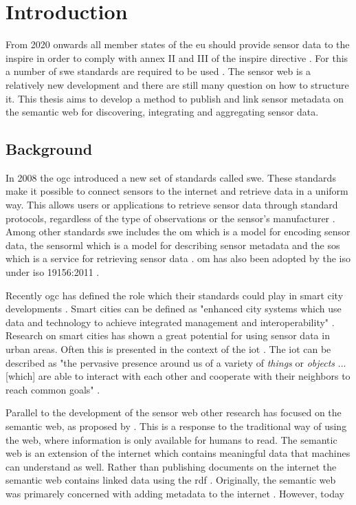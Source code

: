 
\chapter{Introduction}
\label{chap:introduction}

From 2020 onwards all member states of the \ac{eu} should provide sensor data to the \ac{inspire} in order to comply with annex II and III of the \ac{inspire} directive \citep{SDI:INSPIRE5}. For this a number of \ac{swe} standards are required to be used \citep{SDI:INSPIRE2}. The sensor web is a relatively new development and there are still many question on how to structure it. This thesis aims to develop a method to publish and link sensor metadata on the semantic web for discovering, integrating and aggregating sensor data.

\section{Background}
In 2008 the \ac{ogc} introduced a new set of standards called \ac{swe}. These standards make it possible to connect sensors to the internet and retrieve data in a uniform way. This allows users or applications to retrieve sensor data through standard protocols, regardless of the type of observations or the sensor's manufacturer \citep{SW:Botts}. Among other standards \ac{swe} includes the \ac{om} which is a model for encoding sensor data, the \ac{sensorml} which is a model for describing sensor metadata and the \ac{sos} which is a service for retrieving sensor data \citep{SW:OGC}. \ac{om} has also been adopted by the \ac{iso} under \ac{iso} 19156:2011 \citep{SW:ISO}. 

Recently \ac{ogc} has defined the role which their standards could play in smart city developments \citep{SC:OGC}. Smart cities can be defined as "enhanced city systems which use data and technology to achieve integrated management and interoperability" \citep[p. 18]{SC:Moir}. Research on smart cities has shown a great potential for using sensor data in urban areas. Often this is presented in the context of the \ac{iot} \citep{IOT:Zanelli, SSW:Wang2}. The \ac{iot} can be described as "the pervasive presence around us of a variety of \textit{things} or \textit{objects} ... [which] are able to interact with each other and cooperate with their neighbors to reach common goals" \cite[p. 2787]{IOT:Atzori}. 

Parallel to the development of the sensor web other research has focused on the semantic web, as proposed by \cite{LD:Berners-lee}. This is a response to the traditional way of using the web, where information is only available for humans to read. The semantic web is an extension of the internet which contains meaningful data that machines can understand as well. Rather than publishing documents on the internet the semantic web contains linked data using the \ac{rdf} \citep{LD:Bizer}. Originally, the semantic web was primarely concerned with adding metadata to the internet \cite{LD:W3C}. However, today 

